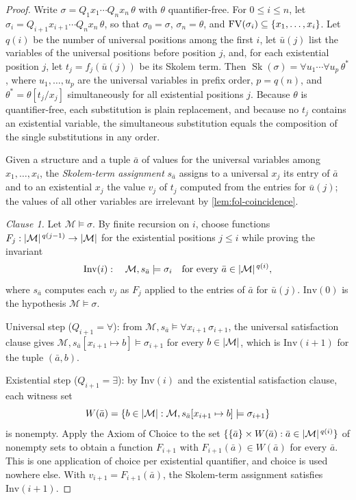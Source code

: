 \documentclass[11pt,oneside,openany]{book}
\theoremstyle{definition}
\theoremstyle{plain}
\theoremstyle{remark}
\DeclarePairedDelimiter{\set}{\lbrace}{\rbrace}
\DeclarePairedDelimiter{\abs}{\lvert}{\rvert}
\newcommand{\Meta}{\mathcal{M}}
\newcommand{\FV}{\operatorname{FV}}
\newcommand{\entails}{\models}
\begin{document}
\begin{proof}
Write \(\sigma=Q_1x_1\cdots Q_nx_n\,\theta\) with \(\theta\)
quantifier-free.  For \(0\le i\le n\), let
\(\sigma_i=Q_{i+1}x_{i+1}\cdots Q_nx_n\,\theta\), so that
\(\sigma_0=\sigma\), \(\sigma_n=\theta\), and
\(\FV(\sigma_i)\subseteq\set{x_1,\ldots,x_i}\).  Let \(q(i)\) be the
number of universal positions among the first \(i\), let \(\bar u(j)\)
list the variables of the universal positions before position \(j\), and,
for each existential position \(j\), let \(t_j=f_j(\bar u(j))\) be its
Skolem term.  Then
\(\operatorname{Sk}(\sigma)=\forall u_1\cdots\forall u_p\,\theta^{*}\),
where \(u_1,\ldots,u_p\) are the universal variables in prefix order,
\(p=q(n)\), and \(\theta^{*}=\theta[t_j/x_j]\) simultaneously for all
existential positions \(j\).  Because \(\theta\) is quantifier-free, each
substitution is plain replacement, and because no \(t_j\) contains an
existential variable, the simultaneous substitution equals the
composition of the single substitutions in any order.

Given a structure and a tuple \(\bar a\) of values for the universal
variables among \(x_1,\ldots,x_i\), the \emph{Skolem-term assignment}
\(s_{\bar a}\) assigns to a universal \(x_j\) its entry of \(\bar a\) and
to an existential \(x_j\) the value \(v_j\) of \(t_j\) computed from the
entries for \(\bar u(j)\); the values of all other variables are
irrelevant by \cref{lem:fol-coincidence}.

\emph{Clause 1.}  Let \(\Meta\entails\sigma\).  By finite recursion on
\(i\), choose functions
\(F_j:\abs{\Meta}^{\,q(j-1)}\to\abs{\Meta}\) for the existential
positions \(j\le i\) while proving the invariant
\[
 \mathrm{Inv}(i):\quad
 \Meta,s_{\bar a}\entails\sigma_i
 \quad\text{for every }\bar a\in\abs{\Meta}^{\,q(i)},
\]
where \(s_{\bar a}\) computes each \(v_j\) as
\(F_j\) applied to the entries of \(\bar a\) for \(\bar u(j)\).
\(\mathrm{Inv}(0)\) is the hypothesis \(\Meta\entails\sigma\).

Universal step (\(Q_{i+1}=\forall\)): from
\(\Meta,s_{\bar a}\entails\forall x_{i+1}\,\sigma_{i+1}\), the universal
satisfaction clause gives
\(\Meta,s_{\bar a}[x_{i+1}\mapsto b]\entails\sigma_{i+1}\) for every
\(b\in\abs{\Meta}\), which is \(\mathrm{Inv}(i+1)\) for the tuple
\((\bar a,b)\).

Existential step (\(Q_{i+1}=\exists\)): by \(\mathrm{Inv}(i)\) and the
existential satisfaction clause, each witness set
\[
 W(\bar a)=\set{b\in\abs{\Meta}:
 \Meta,s_{\bar a}[x_{i+1}\mapsto b]\entails\sigma_{i+1}}
\]
is nonempty.  Apply the Axiom of Choice to the set
\(\set{\set{\bar a}\times W(\bar a):\bar a\in\abs{\Meta}^{\,q(i)}}\) of
nonempty sets to obtain a function \(F_{i+1}\) with
\(F_{i+1}(\bar a)\in W(\bar a)\) for every \(\bar a\).  This is one
application of choice per existential quantifier, and choice is used
nowhere else.  With \(v_{i+1}=F_{i+1}(\bar a)\), the Skolem-term
assignment satisfies \(\mathrm{Inv}(i+1)\).


\end{proof}
\end{document}
